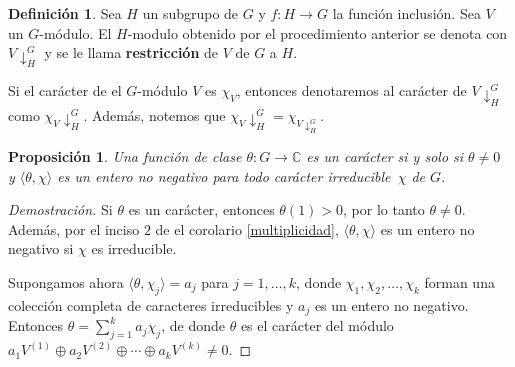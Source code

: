 \documentclass[12pt]{book}
\newtheorem{proposition}[theorem]{Proposición}
\theoremstyle{definition}
\newtheorem{definition}[theorem]{Definición}
\newcounter{in}
\newcounter{ini}
\begin{document}
\begin{definition}
  Sea $H$ un subgrupo de $G$ y $f:H\rightarrow G$ la función
  inclusión. Sea $V$ un $G$-módulo. El $H$-modulo obtenido por el
  procedimiento anterior se denota con $V\downarrow^{G}_{H}$ y se
  le llama \textbf{restricción} de $V$ de $G$ a $H$.
\end{definition}

Si el carácter de el $G$-módulo $V$ es $\chi_{V}$, entonces
denotaremos al carácter de $V\downarrow^{G}_{H}$ como
$\chi_{V}\downarrow^{G}_{H}$. Además, notemos que
$\chi_{V}\downarrow^{G}_{H}=\chi_{V\downarrow^{G}_{H}}$.


\begin{proposition}
\label{fun-cla-caracter}
Una función de clase $\theta:G\rightarrow\mathbb{C}$ es un carácter si
y solo si $\theta\neq 0$ y $\langle\theta,\chi\rangle$ es un entero no
negativo para todo carácter irreducible~$\chi$ de $G$. 
\end{proposition}
\begin{proof}[Demostración]
Si $\theta$ es un carácter, entonces $\theta(1)>0$, por lo tanto
$\theta\neq 0$. Además, por el inciso $2$ de el corolario
\ref{multiplicidad}, $\langle\theta,\chi\rangle$ es un entero no
negativo si $\chi$ es irreducible.

Supongamos ahora $\langle\theta,\chi_{j}\rangle=a_{j}$ para
$j=1,\ldots,k$, donde $\chi_{1},\chi_{2},\ldots,\chi_{k}$ forman una
colección completa de caracteres irreducibles y $a_{j}$ es un entero
no negativo. Entonces $\theta=\sum^{k}_{j=1}a_{j}\chi_{j}$, de donde
$\theta$ es el carácter del módulo~$a_{1}V^{(1)}\oplus
a_{2}V^{(2)}\oplus\cdots\oplus a_{k}V^{(k)}\neq 0$. 
\end{proof}
\end{document}
